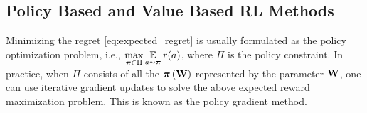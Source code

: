 

\subsection{Policy Based and Value Based RL Methods}

Minimizing the regret \cref{eq:expected_regret} is usually formulated as the policy optimization problem, i.e., $\max\limits_{{\boldsymbol{\pi}} \in \Pi}{ \operatorname*{{\mathbb{E}}}\limits_{ a \sim {\boldsymbol{\pi}} }{ r(a)} }$, where $\Pi$ is the policy constraint. In practice, when $\Pi$ consists of all the ${\boldsymbol{\pi}}\left({\mathbf{W}}\right)$ represented by the parameter ${\mathbf{W}}$, one can use iterative gradient updates to solve the above expected reward maximization problem. This is known as the policy gradient method.

